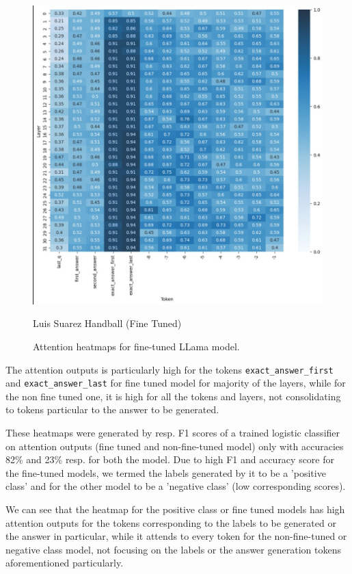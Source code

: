 \documentclass[sigconf, review]{acmart}
\begin{document}
\begin{enumerate}
\begin{figure}[ht]
\begin{minipage}{0.35\textwidth}
             \centering
             \includegraphics[width=\linewidth]{Suarez-positive-probing.jpg}
             \caption{\footnotesize Luis Suarez Handball (Fine Tuned)}
             \label{fig:suarez-positive-probing}
         \end{minipage}
         \caption{\footnotesize Attention heatmaps for fine-tuned LLama model.}
         \label{fig:positive-class-heatmaps}
     \end{figure}

     The attention outputs is particularly high for the tokens \texttt{exact\_answer\_first} and \texttt{exact\_answer\_last} for fine tuned model for majority of the layers, while for the non fine tuned one, it is high for all the tokens and layers, not consolidating to tokens particular to the answer to be generated.
     
     These heatmaps were generated by resp. F1 scores of a trained logistic classifier on attention outputs (fine tuned and non-fine-tuned model) only with accuracies 82\% and 23\% resp. for both the model.
     Due to high F1 and accuracy score for the fine-tuned models, we termed the labels generated by it to be a 'positive class' and for the other model to be a 'negative class' (low corresponding scores).
     
     We can see that the heatmap for the positive class or fine tuned models has high attention outputs for the tokens corresponding to the labels to be generated or the answer in particular, while it attends to every token for the non-fine-tuned or negative class model, not focusing on the labels or the answer generation tokens aforementioned particularly.
    
\end{enumerate}
\end{document}
